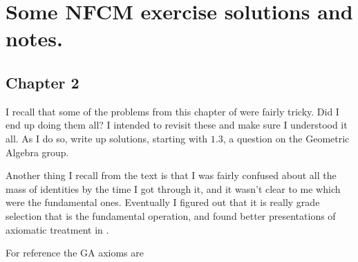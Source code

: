 
%
%





\chapter{Some NFCM exercise solutions and notes. }
\date{ Nov 27, 2008.  Last Revision: $Date: 2009/06/11 16:54:24 $ }

%


\section{Chapter 2 }

I recall that some of the problems from this chapter of
\cite{hestenes1999nfc}
were fairly tricky.  Did I end up doing them all?  I intended to
revisit these and make sure I understood it all.  As I do so, write up
solutions, starting with $1.3$, a question on the Geometric Algebra group.

Another thing I recall from the text is that I was fairly confused about
all the mass of identities by the time I got through it, and it wasn't clear
to me which were the fundamental ones.
Eventually I figured out that it is
really grade selection that is the fundamental operation, and
found better presentations of axiomatic treatment in \cite{doran2003gap}.

For reference the GA axioms are


